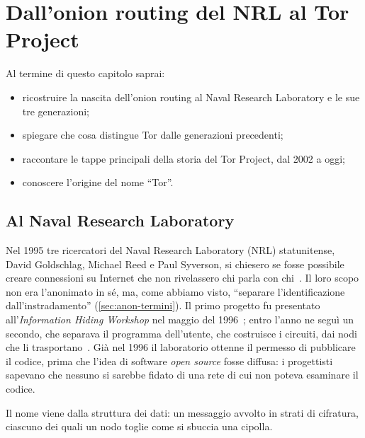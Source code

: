 \chapter{Dall'onion routing del NRL al Tor Project}\label{cap:03-nascita-tor}

\begin{obiettivi}
Al termine di questo capitolo saprai:
\begin{itemize}[nosep]
  \item ricostruire la nascita dell'onion routing al Naval Research Laboratory e le sue tre generazioni;
  \item spiegare che cosa distingue Tor dalle generazioni precedenti;
  \item raccontare le tappe principali della storia del Tor Project, dal 2002 a oggi;
  \item conoscere l'origine del nome \enquote{Tor}.
\end{itemize}
\end{obiettivi}

\section{Al Naval Research Laboratory}\label{sec:nascita-nrl}

Nel 1995 tre ricercatori del Naval Research Laboratory (NRL) statunitense, David Goldschlag, Michael Reed e Paul Syverson, si chiesero se fosse possibile creare connessioni su Internet che non rivelassero chi parla con chi~\cite{torhistory}. Il loro scopo non era l'anonimato in sé, ma, come abbiamo visto, \enquote{separare l'identificazione dall'instradamento} (\cref{sec:anon-termini}). Il primo progetto fu presentato all'\emph{Information Hiding Workshop} nel maggio del 1996~\cite{goldschlag1996hiding}; entro l'anno ne seguì un secondo, che separava il programma dell'utente, che costruisce i circuiti, dai nodi che li trasportano~\cite{syverson2011peel}. Già nel 1996 il laboratorio ottenne il permesso di pubblicare il codice, prima che l'idea di software \emph{open source} fosse diffusa: i progettisti sapevano che nessuno si sarebbe fidato di una rete di cui non poteva esaminare il codice.

Il nome viene dalla struttura dei dati: un messaggio avvolto in strati di cifratura, ciascuno dei quali un nodo toglie come si sbuccia una cipolla.

